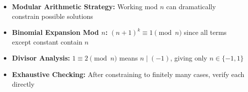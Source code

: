 \begin{takeaways}
\begin{itemize}
\item \textbf{Modular Arithmetic Strategy:} Working mod $n$ can dramatically constrain possible solutions
\item \textbf{Binomial Expansion Mod $n$:} $(n+1)^k \equiv 1 \pmod{n}$ since all terms except constant contain $n$
\item \textbf{Divisor Analysis:} $1 \equiv 2 \pmod{n}$ means $n \mid (-1)$, giving only $n \in \{-1, 1\}$
\item \textbf{Exhaustive Checking:} After constraining to finitely many cases, verify each directly
\end{itemize}
\end{takeaways}
